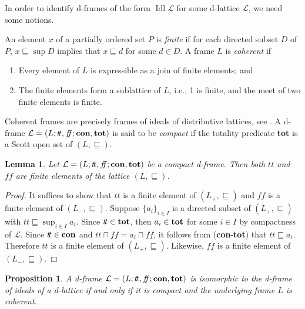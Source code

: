 \documentclass[11pt]{article}
\DeclareMathOperator{\idl}{Idl}
\theoremstyle{plain}
\newtheorem{lem}[thm]{Lemma}
\newtheorem{prop}[thm]{Proposition}
\theoremstyle{definition}
\newcommand{\dbt}{{t\!t}}
\newcommand{\dbf}{{f\!\!f}}
\begin{document}
In order to identify  d-frames  of the form $\idl\mathcal{L}$ for some d-lattice $\mathcal{L}$,  we need some notions. 

An element $x$ of a partially ordered set $P$ is \emph{finite} \cite{Gierz2003,Johnstone} if for each directed subset $D$ of $P$,   $x\sqsubseteq \sup D$ implies that $x\sqsubseteq d$ for some $d\in D$. 
A frame $L$ is \emph{coherent} \cite[page 63]{Johnstone} if \begin{enumerate}[label=\rm(\roman*)] \setlength{\itemsep}{0pt}
\item Every element of $L$ is expressible as a join of finite elements; and 
\item The finite elements form a sublattice of $L$, i.e., 1 is finite, and the meet of two finite elements is finite.
\end{enumerate}

Coherent frames are precisely  frames of ideals of   distributive lattices, see  \cite[page 64]{Johnstone}. 
A d-frame $\mathcal{L}=(L;\dbt,\dbf;{\bf con},{\bf tot})$ is said to be \emph{compact} \cite[Definition 7.5]{JM2008} if the totality predicate {\bf tot} is a Scott open set of $(L,\sqsubseteq)$.  

\begin{lem}\label{t and f are comapct}
Let $\mathcal{L}=(L;\dbt,\dbf;{\bf con},{\bf tot})$ be a compact d-frame. Then both $\dbt$ and $\dbf$ are finite elements of the lattice $(L,\sqsubseteq)$. 
\end{lem}

\begin{proof}
It suffices to show that $\dbt$ is a finite element of  $(L_{+},\sqsubseteq)$ and $\dbf$ is  a finite element of  $(L_{-},\sqsubseteq)$. Suppose $\{a_{i}\}_{i\in I}$ is a directed subset  of  $(L_{+},\sqsubseteq)$ with $\dbt\sqsubseteq \sup_{i\in I}a_i$. Since  $\dbt \in{\bf tot}$, then $a_i \in{\bf tot}$ for some $i\in I$ by compactness of $\mathcal{L}$. Since   $\dbt\in{\bf con}$ and $\dbt\sqcap\dbf=a_i\sqcap\dbf$, it follows from ({\bf con}-{\bf tot}) that $\dbt\sqsubseteq a_i$. Therefore  $\dbt$ is a finite element of  $(L_{+},\sqsubseteq)$. Likewise, $\dbf$ is a finite element of  $(L_{-},\sqsubseteq)$.
\end{proof} 

\begin{prop}\label{d-lattice--d-frame}
A d-frame $\mathcal{L}=(L;\dbt,\dbf;{\bf con},{\bf tot})$ is isomorphic to the d-frame of ideals of a d-lattice if and only if it is compact and the underlying frame $L$ is coherent. 
\end{prop}
\end{document}
